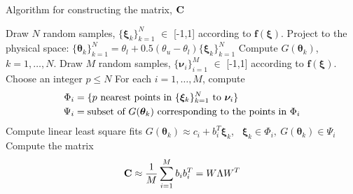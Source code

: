 \bigskip
\begin{breakablealgorithm}
  \caption{Algorithm for constructing the matrix, $\mathbf{{C}}$}
  \begin{algorithmic}[1]
	\State Draw $N$ random samples, $\{\bm{\xi}_k\}_{k=1}^{N}$ $\in$ [-1,1]
	according to $\bm{f(\xi)}$.
	\State Project to the physical space:
	$\{\bm{\theta}_k\}_{k=1}^{N}=\theta_l+0.5(\theta_u-\theta_l)\{\bm{\xi}_k\}_{k=1}^{N}$
	\State Compute $G(\bm\theta_k)$, $k=1, \ldots, N$.
	\State Draw $M$ random samples, $\{\bm{\nu}_i\}_{i=1}^{M}$ $\in$ [-1,1]
	according to $\bm{f(\xi)}$.
	\State Choose an integer $p \leq N$ 
	\State For each $i=1, \ldots, M$, compute 
	\[
	\begin{aligned}
	\Phi_i &= \{ p \text{ nearest points in } \{\bm{\xi}_k\}_{k=1}^{N} \text{ to } \bm{\nu}_i\}\\
	\vspace{-2mm}
	\Psi_i &= \text{subset of } G(\bm\theta_k) \text{ corresponding to the points in } \Phi_i
	\end{aligned}
	\]
	\State Compute linear least square fits 
	 $G(\bm\theta_k) \approx c_i + b_i^T\bm{\xi}_k$, \  $\bm{\xi}_k \in \Phi_i, \ G(\bm\theta_k) \in \Psi_i$
	\State Compute the matrix 
	\[
	\mathbf{{C}} \approx \frac{1}{M} \sum_{i=1}^{M} b_i b_i^T = {W}{\Lambda}{W}^T
	\]
	\EndProcedure
  \end{algorithmic}
  \label{alg:free2}
\end{breakablealgorithm}
\bigskip



